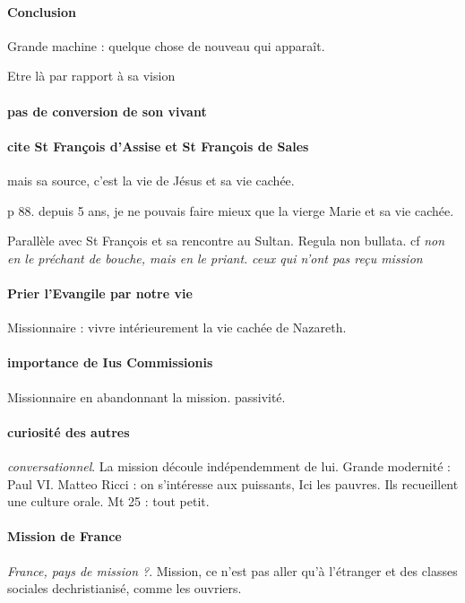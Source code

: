 \paragraph{Conclusion}
Grande machine : quelque chose de nouveau qui apparaît. 

Etre là par rapport à sa vision 

\paragraph{pas de conversion de son vivant}

\paragraph{cite St François d'Assise et St François de Sales} mais sa source, c'est la vie de Jésus et sa vie cachée. 

p 88. depuis 5 ans, je ne pouvais faire mieux que la vierge Marie et sa vie cachée.

Parallèle avec St François et sa rencontre au Sultan. Regula non bullata. cf \textit{non en le préchant de bouche, mais en le priant.} \textit{ceux qui n'ont pas reçu mission}

\paragraph{Prier l'Evangile par notre vie}
Missionnaire : vivre intérieurement la vie cachée de Nazareth. 

\paragraph{importance de Ius Commissionis } Missionnaire en abandonnant la mission. passivité. 

\paragraph{curiosité des autres} \textit{conversationnel}. La mission découle indépendemment de lui. Grande modernité : Paul VI. 
Matteo Ricci : on s'intéresse aux puissants, Ici les pauvres.
Ils recueillent une culture orale.  Mt 25 : tout petit. 

\paragraph{Mission de France} \textit{France, pays de mission ?}. Mission, ce n'est pas aller qu'à l'étranger et des classes sociales dechristianisé, comme les ouvriers. 

